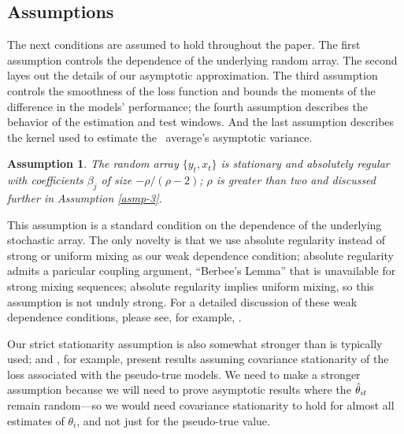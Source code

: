 \documentclass[11pt]{article}
\newtheorem{asmp}{Assumption}
\begin{document}
\subsection{Assumptions}

The next conditions are assumed to hold throughout the paper.  The first
assumption controls the dependence of the underlying random array.
The second layes out the details of our asymptotic approximation.
The third assumption controls the
smoothness of the loss function and bounds the moments of the
difference in the models' performance; the fourth assumption describes
the behavior of the estimation and test windows.  And the last
assumption describes the kernel used to estimate the \oos\ average's
asymptotic variance.

\begin{asmp}\label{asmp-1}
  The random array $\{y_t,x_t\}$ is stationary and absolutely regular
  with coefficients $\beta_j$ of size $-\rho/(\rho-2)$; $\rho$ is
  greater than two and discussed further in Assumption \ref{asmp-3}.
\end{asmp}

This assumption is a standard condition on the dependence of the
underlying stochastic array. The only novelty is that we use
absolute regularity instead of strong or uniform mixing as our
weak dependence condition; absolute regularity admits a paricular
coupling argument, ``Berbee's Lemma'' \citep[reproduced in this
paper as Lemma A.1 for reference]{Ber:79} that is
unavailable for strong mixing sequences; absolute regularity
implies uniform mixing, so this assumption is not unduly strong.
For a detailed discussion of these weak dependence conditions,
please see, for example, \citet{Dav:94}.

Our strict stationarity assumption is also somewhat stronger than is
typically used; \citet{Wes:96} and \citet{Mcc:07}, for example,
present results assuming covariance stationarity of the loss
associated with the pseudo-true models. We need to make a stronger
assumption because we will need to prove asymptotic results where the
$\hat\theta_{it}$ remain random---so we would need covariance stationarity to
hold for almost all estimates of $\theta_i$, and not just for the
pseudo-true value.
\end{document}
